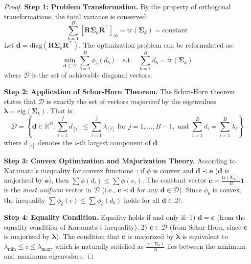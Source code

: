 \begin{proof}
\textbf{Step 1: Problem Transformation.}
By the property of orthogonal transformations, the total variance is conserved:
\begin{equation}
\sum_{b=1}^B [\mathbf{R} \boldsymbol{\Sigma}_k \mathbf{R}^\top]_{bb} = \mathrm{tr}(\boldsymbol{\Sigma}_k) = \text{constant}
\end{equation}
Let $\mathbf{d} = \mathrm{diag}(\mathbf{R} \boldsymbol{\Sigma}_k \mathbf{R}^\top)$. The optimization problem can be reformulated as:
\begin{equation}
\min_{\mathbf{d} \in \mathcal{D}} \sum_{b=1}^B \phi_b(d_b) \quad \text{s.t.} \quad \sum_{b=1}^B d_b = \mathrm{tr}(\boldsymbol{\Sigma}_k)
\end{equation}
where $\mathcal{D}$ is the set of achievable diagonal vectors.

\textbf{Step 2: Application of Schur-Horn Theorem.}
The Schur-Horn theorem~\cite{schur_horn} states that $\mathcal{D}$ is exactly the set of vectors \textit{majorized} by the eigenvalues $\boldsymbol{\lambda} = \mathrm{eig}(\boldsymbol{\Sigma}_k)$. That is:
\begin{equation}
\mathcal{D} = \left\{ \mathbf{d} \in \mathbb{R}^B : \sum_{i=1}^j d_{[i]} \leq \sum_{i=1}^j \lambda_{[i]} \text{ for } j=1,\dots,B-1, \text{ and } \sum_{i=1}^B d_i = \sum_{i=1}^B \lambda_i \right\}
\end{equation}
where $d_{[i]}$ denotes the $i$-th largest component of $\mathbf{d}$.

\textbf{Step 3: Convex Optimization and Majorization Theory.}
According to Karamata's inequality for convex functions~\cite{karamata}: if $\phi$ is convex and $\mathbf{d} \prec \mathbf{e}$ ($\mathbf{d}$ is majorized by $\mathbf{e}$), then $\sum \phi(d_i) \le \sum \phi(e_i)$.
The constant vector $\mathbf{c} = \frac{\mathrm{tr}(\boldsymbol{\Sigma}_k)}{B} \mathbf{1}$ is the \textit{most uniform} vector in $\mathcal{D}$ (i.e., $\mathbf{c} \prec \mathbf{d}$ for any $\mathbf{d} \in \mathcal{D}$).
Since $\phi_b$ is convex, the inequality $\sum \phi_b(c) \le \sum \phi_b(d_b)$ holds for all $\mathbf{d} \in \mathcal{D}$.

\textbf{Step 4: Equality Condition.}
Equality holds if and only if:
1) $\mathbf{d} = \mathbf{c}$ (from the equality condition of Karamata's inequality).
2) $\mathbf{c} \in \mathcal{D}$ (from Schur-Horn, since $\mathbf{c}$ is majorized by $\boldsymbol{\lambda}$).
The condition that $\mathbf{c}$ is majorized by $\boldsymbol{\lambda}$ is equivalent to $\lambda_{\min} \le c \le \lambda_{\max}$, which is naturally satisfied as $\frac{\mathrm{tr}(\boldsymbol{\Sigma}_k)}{B}$ lies between the minimum and maximum eigenvalues.


\end{proof}
